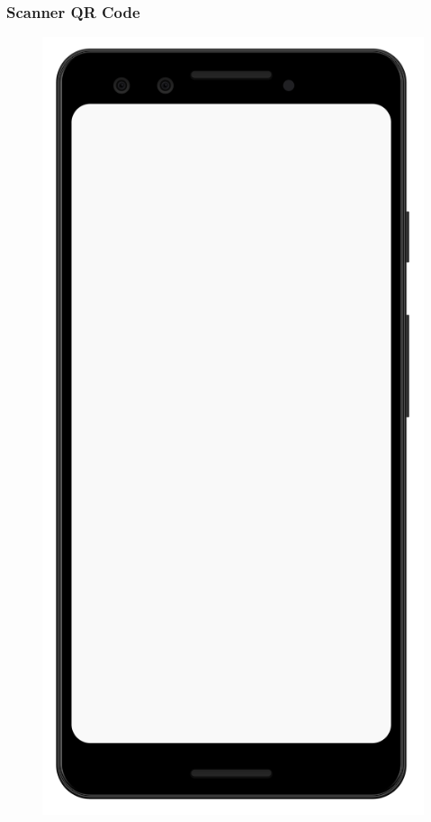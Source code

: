 \documentclass[12pt,a4paper,twoside,openright,titlepage]{book}
\begin{document}
\subsubsection{Scanner QR Code}
\begin{figure}[H]
\centering
\includegraphics[scale = 0.2]{mobile}

\end{figure}
\end{document}
